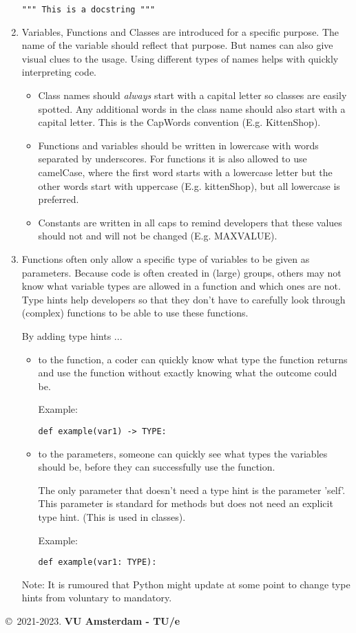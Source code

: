 \documentclass[nobib]{tufte-handout}
\newcommand{\B}{\bfseries}
\begin{document}
\begin{enumerate}
\indent	\lstinline{""" This is a docstring """}
  

\item Variables, Functions and Classes are introduced for a specific purpose.
\marginpar{\B Naming}
  The name of the variable should reflect that purpose.
  But names can also give visual clues to the usage. 
  Using different types of names helps with quickly interpreting code.
  \begin{itemize}
      \item Class names should \emph{always} start with a capital letter so classes are easily spotted. Any additional words in the class name should also start with a capital letter. This is the CapWords convention (E.g. KittenShop).
      \item Functions and variables should be written in lowercase with words separated by underscores. 
      For functions it is also allowed to use camelCase, where the first word starts with a lowercase letter but the other words start with uppercase (E.g. kittenShop), but all lowercase is preferred.
      \item Constants are written in all caps to remind developers that these values should not and will not be changed (E.g. MAXVALUE).
  \end{itemize}
  
  

\item Functions often only allow a specific type of variables 
\marginpar{\B Type~Hints}
  to be given as parameters.
  Because code is often created in (large) groups, others may not know what variable types are allowed in a function and which ones are not.
  Type hints help developers so that they don't have to carefully look through (complex) functions to be able to use these functions.
  
  By adding type hints ...
  \begin{itemize}
      \item to the function, a coder can quickly know what type the function returns and use the function without exactly knowing what the outcome could be.
      
      Example: \begin{lstlisting}[numbers=none]
      def example(var1) -> TYPE:
      \end{lstlisting}
      \item to the parameters, someone can quickly see what types the variables should be, before they can successfully use the function.
      
      The only parameter that doesn't need a type hint is the parameter 'self'. This parameter is standard for methods but does not need an explicit type hint. (This is used in classes).
      
      Example: \begin{lstlisting}[numbers=none]
      def example(var1: TYPE):
      \end{lstlisting}
  \end{itemize}
  Note: It is rumoured that Python might update at some point to change type hints from voluntary to mandatory.


\end{enumerate}


%



\copyright~2021-2023. \textbf{VU Amsterdam - TU/e}
\end{document}
